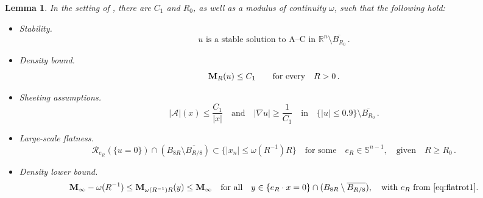 \documentclass{article}
\newcommand{\R}{\mathbb{R}}
\newcommand{\Sp}{\mathbb{S}}
\newtheorem{lemma}[theorem]{Lemma}
\theoremstyle{definition}
\begin{document}
\begin{lemma}
In the setting of , there are $C_1$ and $R_0$, as well as a modulus of continuity $\omega$, such that the following hold:
\begin{itemize}
    \item Stability.
    $$u \mbox{ is a stable solution to A--C in } \R^n\setminus \overline{B_{R_0}}\,.$$
    \item Density bound. \begin{equation}\label{eq:engrowth}
            {\bf M}_R(u)\leq C_1\qquad\mbox{for every}\quad R>0\,.
        \end{equation}
    \item Sheeting assumptions. \begin{equation}\label{eq:sheetgb}
        |\mathcal{A}|(x)\leq \frac{C_1}{|x|}\quad \mbox{and}\quad |\nabla u|\geq \frac{1}{C_1}\quad \mbox{in}\quad \{|u|\leq 0.9\}\setminus \overline{B_{R_0}}\,.
        \end{equation}
    \item Large-scale flatness. \begin{equation}\label{eq:flatrot1}
        \mathcal R_{e_R}(\{u=0\})\cap (B_{8R}\setminus \overline{B_{R/8}})\subset\{|x_n|\leq \omega(R^{-1}) R\}\quad \mbox{for some}\quad e_R\in\Sp^{n-1},\quad\mbox{given}\quad R\geq R_0\,.
        \end{equation}
    \item Density lower bound. \begin{equation}\label{eq:nodensgaps}
        {\bf M}_\infty-\omega(R^{-1})\leq {\bf M}_{\omega(R^{-1})R}(y)\leq {\bf M}_\infty \quad\mbox{for all}\quad y\in \{e_R\cdot x=0\}\cap (B_{8R}\setminus \overline{B_{R/8}}),\quad\mbox{with } e_R\mbox{ from } \eqref{eq:flatrot1}.
        \end{equation}
\end{itemize}
\end{lemma}
\end{document}
